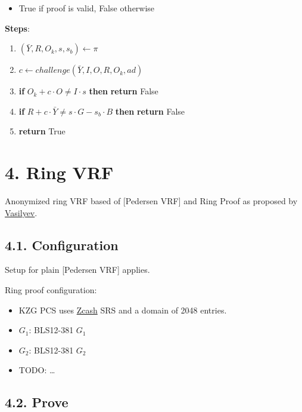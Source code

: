 \documentclass[
]{article}
\providecommand{\tightlist}{%
  \setlength{\itemsep}{0pt}\setlength{\parskip}{0pt}}
\begin{document}
\begin{itemize}
\tightlist
\item
  True if proof is valid, False otherwise
\end{itemize}

\textbf{Steps}:

\begin{enumerate}
\def\labelenumi{\arabic{enumi}.}
\tightlist
\item
  \((\bar{Y}, R, O_k, s, s_b) \leftarrow \pi\)
\item
  \(c \leftarrow challenge(\bar{Y}, I, O, R, O_k, ad)\)
\item
  \textbf{if} \(O_k + c \cdot O \neq I \cdot s\) \textbf{then}
  \textbf{return} False
\item
  \textbf{if} \(R + c \cdot \bar{Y} \neq s \cdot G - s_b \cdot B\)
  \textbf{then} \textbf{return} False
\item
  \textbf{return} True
\end{enumerate}

\hypertarget{ring-vrf}{%
\section{4. Ring VRF}\label{ring-vrf}}

Anonymized ring VRF based of {[}Pedersen VRF{]} and Ring Proof as
proposed by \href{https://hackmd.io/ulW5nFFpTwClHsD0kusJAA}{Vasilyev}.

\hypertarget{configuration-2}{%
\subsection{4.1. Configuration}\label{configuration-2}}

Setup for plain {[}Pedersen VRF{]} applies.

Ring proof configuration:

\begin{itemize}
\tightlist
\item
  KZG PCS uses
  \href{https://zfnd.org/conclusion-of-the-powers-of-tau-ceremony}{Zcash}
  SRS and a domain of 2048 entries.
\item
  \(G_1\): BLS12-381 \(G_1\)
\item
  \(G_2\): BLS12-381 \(G_2\)
\item
  TODO: \ldots{}
\end{itemize}

\hypertarget{prove-2}{%
\subsection{4.2. Prove}\label{prove-2}}
\end{document}
